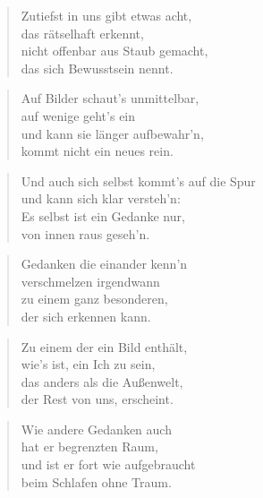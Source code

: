 \documentclass[10pt,a4paper]{article}
\begin{document}
\begin{multicols}{2}
\begin{verse}
Zutiefst in uns gibt etwas acht, \\
das rätselhaft erkennt, \\
nicht offenbar aus Staub gemacht, \\
das sich Bewusstsein nennt. \\
\end{verse}

\begin{verse}
Auf Bilder schaut’s unmittelbar, \\
auf wenige geht’s ein \\
und kann sie länger aufbewahr’n, \\
kommt nicht ein neues rein. \\
\end{verse}

\begin{verse}
Und auch sich selbst kommt’s auf die Spur \\
und kann sich klar versteh’n: \\
Es selbst ist ein Gedanke nur, \\
von innen raus geseh’n. \\
\end{verse}

\begin{verse}
Gedanken die einander kenn’n \\
verschmelzen irgendwann \\
zu einem ganz besonderen, \\
der sich erkennen kann. \\
\end{verse}

\begin{verse}
Zu einem der ein Bild enthält, \\
wie’s ist, ein Ich zu sein, \\
das anders als die Außenwelt, \\
der Rest von uns, erscheint. \\
\end{verse}

\begin{verse}
Wie andere Gedanken auch \\
hat er begrenzten Raum, \\
und ist er fort wie aufgebraucht \\
beim Schlafen ohne Traum. \\
\end{verse}


\end{multicols}
\end{document}
